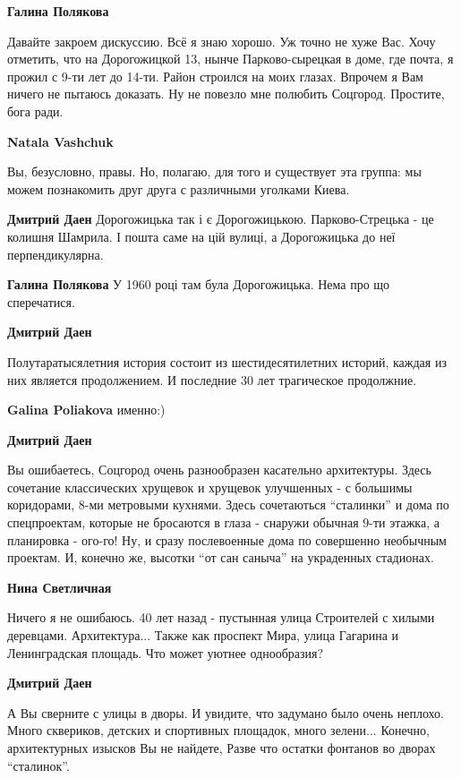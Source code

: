 \begin{itemize}
\begin{itemize}
\begin{itemize}
\textbf{Галина Полякова} 

Давайте закроем дискуссию. Всё я знаю хорошо. Уж точно не хуже Вас. Хочу
отметить, что на Дорогожицкой 13, нынче Парково-сырецкая в доме, где почта, я
прожил с 9-ти лет до 14-ти. Район строился на моих глазах. Впрочем я Вам ничего
не пытаюсь доказать. Ну не повезло мне полюбить Соцгород. Простите, бога ради.

\textbf{Natala Vashchuk} 

Вы, безусловно, правы. Но, полагаю, для того и существует эта группа: мы можем
познакомить друг друга с различными уголками Киева.

\textbf{Дмитрий Даен} Дорогожицька так і є Дорогожицькою.
Парково-Стрецька - це колишня Шамрила. І пошта саме на цій вулиці, а Дорогожицька до неї перпендикулярна.

\textbf{Галина Полякова} У 1960 році там була Дорогожицька. Нема про що сперечатися.
\end{itemize} %

\textbf{Дмитрий Даен} 

Полутаратысялетния история состоит из шестидесятилетних историй, каждая из них
является продолжением. И последние 30 лет трагическое продолжние.

\textbf{Galina Poliakova} именно:)

\textbf{Дмитрий Даен} 

Вы ошибаетесь, Соцгород очень разнообразен касательно архитектуры. Здесь
сочетание классических хрущевок и хрущевок улучшенных - с большимы коридорами,
8-ми метровыми кухнями. Здесь сочетаються \enquote{сталинки} и дома по спецпроектам,
которые не бросаются в глаза - снаружи обычная 9-ти этажка, а планировка -
ого-го! Ну, и сразу послевоенные дома по совершенно необычным проектам. И,
конечно же, высотки \enquote{от сан саныча} на украденных стадионах.

\begin{itemize} %
\textbf{Нина Светличная} 

Ничего я не ошибаюсь. 40 лет назад - пустынная улица Строителей с хилыми
деревцами. Архитектура... Также как проспект Мира, улица Гагарина и
Ленинградская площадь. Что может уютнее однообразия?


\textbf{Дмитрий Даен} 

А Вы сверните с улицы в дворы. И увидите, что задумано было очень неплохо.
Много сквериков, детских и спортивных площадок, много зелени... Конечно,
архитектурных изысков Вы не найдете, Разве что остатки фонтанов во дворах
\enquote{сталинок}.


\end{itemize}
\end{itemize}
\end{itemize}
